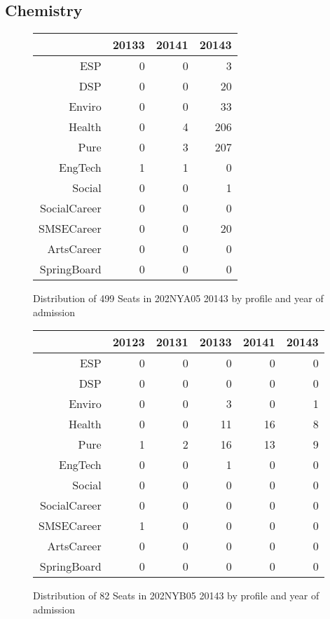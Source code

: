 \documentclass{article}\usepackage[]{graphicx}\usepackage[]{color}
\begin{document}
\subsection{Chemistry}
\begin{figure}[H]
\centering
\begin{tabular}{rrrr}
  \hline
 & 20133 & 20141 & 20143 \\ 
  \hline
ESP &   0 &   0 &   3 \\ 
  DSP &   0 &   0 &  20 \\ 
  Enviro &   0 &   0 &  33 \\ 
  Health &   0 &   4 & 206 \\ 
  Pure &   0 &   3 & 207 \\ 
  EngTech &   1 &   1 &   0 \\ 
  Social &   0 &   0 &   1 \\ 
  SocialCareer &   0 &   0 &   0 \\ 
  SMSECareer &   0 &   0 &  20 \\ 
  ArtsCareer &   0 &   0 &   0 \\ 
  SpringBoard &   0 &   0 &   0 \\ 
   \hline
\end{tabular}
\caption{Distribution of 499 Seats in 202NYA05 20143 by profile and year of admission} 
\end{figure}
\begin{figure}[H]
\centering
\begin{tabular}{rrrrrr}
  \hline
 & 20123 & 20131 & 20133 & 20141 & 20143 \\ 
  \hline
ESP &   0 &   0 &   0 &   0 &   0 \\ 
  DSP &   0 &   0 &   0 &   0 &   0 \\ 
  Enviro &   0 &   0 &   3 &   0 &   1 \\ 
  Health &   0 &   0 &  11 &  16 &   8 \\ 
  Pure &   1 &   2 &  16 &  13 &   9 \\ 
  EngTech &   0 &   0 &   1 &   0 &   0 \\ 
  Social &   0 &   0 &   0 &   0 &   0 \\ 
  SocialCareer &   0 &   0 &   0 &   0 &   0 \\ 
  SMSECareer &   1 &   0 &   0 &   0 &   0 \\ 
  ArtsCareer &   0 &   0 &   0 &   0 &   0 \\ 
  SpringBoard &   0 &   0 &   0 &   0 &   0 \\ 
   \hline
\end{tabular}
\caption{Distribution of 82 Seats in 202NYB05 20143 by profile and year of admission} 
\end{figure}
\end{document}
